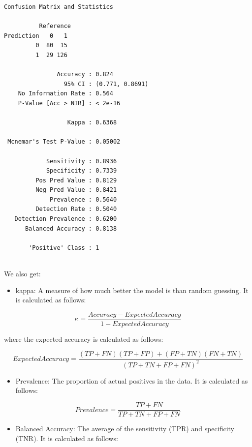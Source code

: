 \documentclass[
  letterpaper,
]{krantz}
\providecommand{\tightlist}{%
  \setlength{\itemsep}{0pt}\setlength{\parskip}{0pt}}\usepackage{longtable,booktabs,array}
\begin{document}
\begin{verbatim}
Confusion Matrix and Statistics

          Reference
Prediction   0   1
         0  80  15
         1  29 126
                                         
               Accuracy : 0.824          
                 95% CI : (0.771, 0.8691)
    No Information Rate : 0.564          
    P-Value [Acc > NIR] : < 2e-16        
                                         
                  Kappa : 0.6368         
                                         
 Mcnemar's Test P-Value : 0.05002        
                                         
            Sensitivity : 0.8936         
            Specificity : 0.7339         
         Pos Pred Value : 0.8129         
         Neg Pred Value : 0.8421         
             Prevalence : 0.5640         
         Detection Rate : 0.5040         
   Detection Prevalence : 0.6200         
      Balanced Accuracy : 0.8138         
                                         
       'Positive' Class : 1              
                                         
\end{verbatim}

We also get:

\begin{itemize}
\tightlist
\item
  kappa: A measure of how much better the model is than random guessing.
  It is calculated as follows:
\end{itemize}

\[\kappa = \frac{Accuracy - ExpectedAccuracy}{1 - ExpectedAccuracy}\]

where the expected accuracy is calculated as follows:

\[ExpectedAccuracy = \frac{(TP + FN)(TP + FP) + (FP + TN)(FN + TN)}{(TP + TN + FP + FN)^2}\]

\begin{itemize}
\tightlist
\item
  Prevalence: The proportion of actual positives in the data. It is
  calculated as follows:
\end{itemize}

\[Prevalence = \frac{TP + FN}{TP + TN + FP + FN}\]

\begin{itemize}
\tightlist
\item
  Balanced Accuracy: The average of the sensitivity (TPR) and
  specificity (TNR). It is calculated as follows:
\end{itemize}
\end{document}
